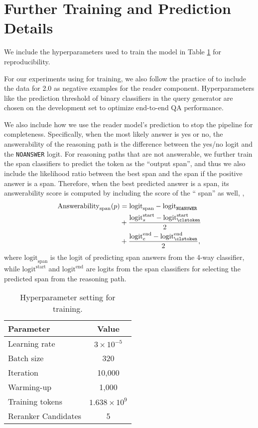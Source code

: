\section{Further Training and Prediction Details} \label{sec:further_training_details}

We include the hyperparameters used to train the \irrr{} model in Table \ref{tab:hyperparams} for reproducibility.

For our experiments using \squad{} for training, we also follow the practice of \citet{asai2020learning} to include the data for \squad{} 2.0 \citep{rajpurkar2018know} as negative examples for the reader component.
Hyperparameters like the prediction threshold of binary classifiers in the query generator are chosen on the development set to optimize end-to-end QA performance.

We also include how we use the reader model's prediction to stop the \irrr{} pipeline for completeness.
Specifically, when the most likely answer is yes or no, the answerability of the reasoning path is the difference between the yes/no logit and the \texttt{NOANSWER} logit.
For reasoning paths that are not answerable, we further train the span classifiers to predict the \clstoken{} token as the ``output span'', and thus we also include the likelihood ratio between the best span and the \clstoken{} span if the positive answer is a span.
Therefore, when the best predicted answer is a span, its answerability score is computed by including the score of the ``\clstoken{} span'' as well, \ie,
\begin{align}
    \mathrm{Answerability}_{\text{span}}(p) &= \mathrm{logit}_{\text{span}} - \mathrm{logit}_{\texttt{NOANSWER}} \nonumber \\
    &+ \frac{\mathrm{logit}_{s}^{\text{start}} - \mathrm{logit}_{\clstoken}^{\text{start}}}{2} \nonumber \\
    &+ \frac{\mathrm{logit}_{e}^{\text{end}} - \mathrm{logit}_{\clstoken}^{\text{end}}}{2},
\end{align}
where $\mathrm{logit}_{\text{span}}$ is the logit of predicting span answers from the 4-way classifier, while $\mathrm{logit}^{\text{start}}$ and $\mathrm{logit}^{\text{end}}$ are logits from the span classifiers for selecting the predicted span from the reasoning path.

\begin{table}
    \centering
    \small
    \begin{tabular}{lc}
        \toprule
        Parameter & Value \\
        \midrule
        Learning rate & $3\times 10^{-5}$ \\
        Batch size & 320 \\
        Iteration & 10,000 \\
        Warming-up & 1,000 \\
        Training tokens & $1.638\times 10^9$\\
        Reranker Candidates & 5 \\
        \bottomrule
    \end{tabular}
    \caption{Hyperparameter setting for \irrr{} training.} 
    \label{tab:hyperparams}
\end{table}

